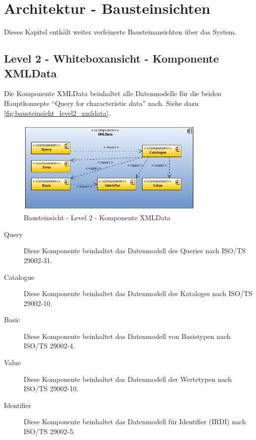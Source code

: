 \chapter{Architektur - Bausteinsichten} \label{kap:anh_architektur}

Dieses Kapitel enthält weiter verfeinerte Bausteinansichten über das System.

\section{Level 2 - Whiteboxansicht - Komponente XMLData}

Die Komponente XMLData beinhaltet alle Datenmodelle für die beiden Hauptkonzepte \enquote{Query for characteristic data} nach. Siehe dazu \autoref{fig:bausteinsicht_level2_xmldata}. 

\begin{figure}[htbp]
	\centering
		\includegraphics[width=0.82\textwidth]{images/bausteinsicht_plib_level2_xmldata.png}
	\caption{Bausteinsicht - Level 2 - Komponente XMLData}
	\label{fig:bausteinsicht_level2_xmldata}
\end{figure}

\begin{description}
\item[Query] Diese Komponente beinhaltet das Datenmodell des Queries nach ISO/TS 29002-31. 
\item[Catalogue] Diese Komponente beinhaltet das Datenmodell des Kataloges nach ISO/TS 29002-10. 
\item[Basic] Diese Komponente beinhaltet das Datenmodell von Basistypen nach ISO/TS 29002-4.
\item[Value] Diese Komponente beinhaltet das Datenmodell der Wertetypen nach ISO/TS 29002-10.
\item[Identifier] Diese Komponente beinhaltet das Datenmodell für Identifier (IRDI) nach ISO/TS 29002-5. 
\end{description}

